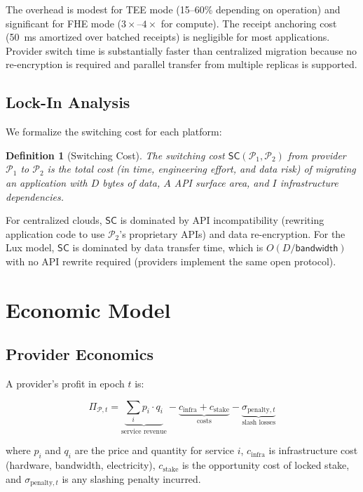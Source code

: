 \documentclass[11pt,a4paper]{article}
\newtheorem{definition}{Definition}
\begin{document}
The overhead is modest for TEE mode (15--60\% depending on operation)
and significant for FHE mode ($3\times$--$4\times$ for compute). The
receipt anchoring cost (50~ms amortized over batched receipts) is
negligible for most applications. Provider switch time is substantially
faster than centralized migration because no re-encryption is required
and parallel transfer from multiple replicas is supported.

\subsection{Lock-In Analysis}

We formalize the switching cost for each platform:

\begin{definition}[Switching Cost]
The switching cost $\mathsf{SC}(\mathcal{P}_1, \mathcal{P}_2)$ from provider
$\mathcal{P}_1$ to $\mathcal{P}_2$ is the total cost (in time, engineering
effort, and data risk) of migrating an application with $D$ bytes of data,
$A$ API surface area, and $I$ infrastructure dependencies.
\end{definition}

For centralized clouds, $\mathsf{SC}$ is dominated by API incompatibility
(rewriting application code to use $\mathcal{P}_2$'s proprietary APIs) and
data re-encryption. For the Lux model, $\mathsf{SC}$ is dominated by data
transfer time, which is $O(D / \mathsf{bandwidth})$ with no API rewrite
required (providers implement the same open protocol).

\section{Economic Model}\label{sec:economics}

\subsection{Provider Economics}

A provider's profit in epoch $t$ is:

\begin{equation}
    \Pi_{\mathcal{P}, t} = \underbrace{\sum_{i} p_i \cdot q_i}_{\text{service revenue}} - \underbrace{c_{\text{infra}} + c_{\text{stake}}}_{\text{costs}} - \underbrace{\sigma_{\text{penalty},t}}_{\text{slash losses}}
\end{equation}

where $p_i$ and $q_i$ are the price and quantity for service $i$,
$c_{\text{infra}}$ is infrastructure cost (hardware, bandwidth, electricity),
$c_{\text{stake}}$ is the opportunity cost of locked stake, and
$\sigma_{\text{penalty},t}$ is any slashing penalty incurred.
\end{document}
